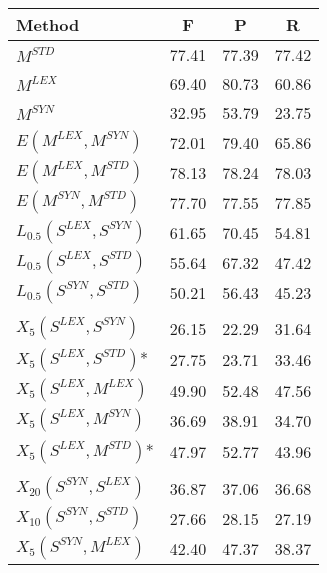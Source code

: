 \begin{table}[]
\centering
\setlength\tabcolsep{2.75pt}
\begin{tabular}{@{\makebox[1.50em][l]{\rownumber\space}}lccc@{}}
\toprule
\textbf{Method} & \textbf{F} & \textbf{P} & \textbf{R}\\ \midrule
$M^{STD}$                    & 77.41 & 77.39 & 77.42  \\ 
$M^{LEX}$                    & 69.40 & 80.73 & 60.86 \\
\gdef\rownumber{\circlednumber{\stepcounter{magicrownumbers}\arabic{magicrownumbers}}}%
$M^{SYN}$                    & 32.95 & 53.79 & 23.75 \\ 
\midrule
$E(M^{LEX}, M^{SYN})$        & 72.01 & 79.40  & 65.86 \\
$E(M^{LEX}, M^{STD})$        & 78.13 & 78.24 & 78.03 \\
$E(M^{SYN}, M^{STD})$        & 77.70 & 77.55 & 77.85 \\
\midrule
$L_{0.5}(S^{LEX}, S^{SYN})$  & 61.65 & 70.45 & 54.81 \\
$L_{0.5}(S^{LEX}, S^{STD})$  & 55.64   & 67.32 & 47.42 \\
$L_{0.5}(S^{SYN}, S^{STD})$  & 50.21 & 56.43 & 45.23 \\ 
\midrule	
                             &       &       &       \\
$X_5(S^{LEX}, S^{SYN})$      & 26.15           & 22.29           & 31.64           \\
$X_5(S^{LEX}, S^{STD})$*  & 27.75         & 23.71            & 33.46     \\ 
$X_5(S^{LEX}, M^{LEX})$  & 49.90           & 52.48            & 47.56           \\ 
$X_5(S^{LEX}, M^{SYN})$  & 36.69           & 38.91            & 34.70           \\ 
$X_5(S^{LEX}, M^{STD})$* & 47.97           & 52.77            & 43.96           \\  
%
                             &       &       &       \\
$X_{20}(S^{SYN}, S^{LEX})$     & 36.87          & 37.06           & 36.68           \\
$X_{10}(S^{SYN}, S^{STD})$  & 27.66           & 28.15            & 27.19     \\ 
$X_5(S^{SYN}, M^{LEX})$ &  42.40          & 47.37            & 38.37          \\ 

\end{tabular}
\end{table}
